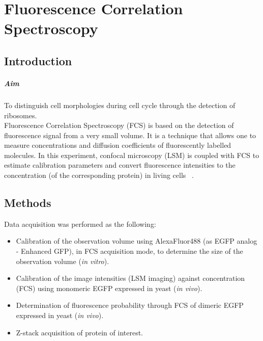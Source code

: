 
\chapter{Fluorescence Correlation Spectroscopy}
\label{chp:FCS}


\section{Introduction}
\paragraph{Aim} To distinguish cell morphologies during cell cycle through the detection of ribosomes. 
\\

Fluorescence Correlation Spectroscopy (FCS) is based on the detection of fluorescence signal from a very small volume.
It is a technique that allows one to measure concentrations and diffusion coefficients of fluorescently labelled molecules.
In this experiment, confocal microscopy (LSM) is coupled with FCS to estimate calibration parameters and convert fluorescence intensities to the concentration (of the corresponding protein) in living cells ~\cite{Politi2018}.

\section{Methods}
Data acquisition was performed as the following:
\begin{itemize}
\item Calibration of the observation volume using AlexaFluor488 (as EGFP analog - Enhanced GFP), in FCS acquisition mode, to determine the size of the observation volume (\textit{in vitro}). 
\item Calibration of the image intensities (LSM imaging) against concentration (FCS) using monomeric EGFP expressed in yeast (\textit{in vivo}).
\item Determination of fluorescence probability through FCS of dimeric EGFP expressed in yeast (\textit{in vivo}).
\item Z-stack acquisition of protein of interest.
\end{itemize}

